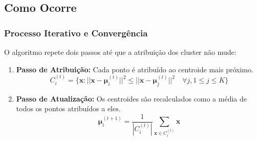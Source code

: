 \documentclass{beamer}
\begin{document}
\subsection{Como Ocorre}
\begin{frame}
    \frametitle{Processo Iterativo e Convergência}
    O algoritmo repete dois passos até que a atribuição dos cluster não mude:
    
    \begin{enumerate}
        \item \textbf{Passo de Atribuição:} Cada ponto é atribuído ao centroide mais próximo.
        \[C_i^{(t)} = \{ \mathbf{x} : ||\mathbf{x} - \boldsymbol{\mu}_i^{(t)}||^2 \le ||\mathbf{x} - \boldsymbol{\mu}_j^{(t)}||^2 \quad \forall j, 1 \le j \le K \}\]
        
        \item \textbf{Passo de Atualização:} Os centroides são recalculados como a média de todos os pontos atribuídos a eles.
        \[\boldsymbol{\mu}_i^{(t+1)} = \frac{1}{|C_i^{(t)}|} \sum_{\mathbf{x} \in C_i^{(t)}} \mathbf{x}\]
    \end{enumerate}
    

\end{frame}
\end{document}
